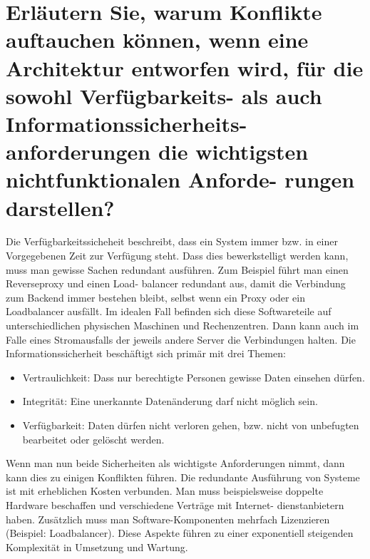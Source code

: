 \documentclass[12pt]{article}
\begin{document}
\section{Erläutern Sie, warum Konflikte auftauchen können, wenn eine Architektur entworfen wird, für die sowohl
Verfügbarkeits- als auch Informationssicherheits- anforderungen die wichtigsten nichtfunktionalen Anforde-
rungen darstellen?}
Die Verfügbarkeitssicheheit beschreibt, dass ein System immer bzw. in einer Vorgegebenen Zeit zur Verfügung steht. Dass dies bewerkstelligt werden kann, muss man gewisse Sachen redundant ausführen. Zum Beispiel führt man einen Reverseproxy und einen Load- balancer redundant aus, damit die Verbindung zum Backend immer bestehen bleibt, selbst wenn ein Proxy oder ein Loadbalancer ausfällt. Im idealen Fall befinden sich diese Softwareteile auf unterschiedlichen physischen Maschinen und Rechenzentren. Dann kann auch im Falle eines Stromausfalls der jeweils andere Server die Verbindungen halten. Die Informationssicherheit beschäftigt sich primär mit drei Themen:
\begin{itemize}
 \item Vertraulichkeit: Dass nur berechtigte Personen gewisse Daten einsehen dürfen.
 \item Integrität: Eine unerkannte Datenänderung darf nicht möglich sein.
 \item Verfügbarkeit: Daten dürfen nicht verloren gehen, bzw. nicht von unbefugten bearbeitet oder gelöscht werden.
\end{itemize}


Wenn man nun beide Sicherheiten als wichtigste Anforderungen nimmt, dann kann dies zu einigen Konflikten führen.
Die redundante Ausführung von Systeme ist mit erheblichen Kosten verbunden. Man muss beispielsweise doppelte Hardware beschaffen und verschiedene Verträge mit Internet- dienstanbietern haben. Zusätzlich muss man Software-Komponenten mehrfach Lizenzieren (Beispiel: Loadbalancer). Diese Aspekte führen zu einer exponentiell steigenden Komplexität in Umsetzung und Wartung.
\cite{info}
\cite{verf}
\end{document}
